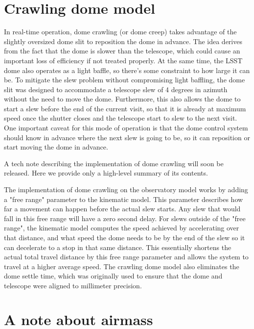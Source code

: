 \documentclass[DM,authoryear,toc]{lsstdoc}
\begin{document}
\section{Crawling dome model}

In real-time operation, dome crawling (or dome creep) takes advantage of the slightly oversized dome slit to reposition the dome in advance.
The idea derives from the fact that the dome is slower than the telescope, which could cause an important loss of efficiency if not treated properly.
At the same time, the LSST dome also operates as a light baffle, so there's some constraint to how large it can be. To mitigate the slew problem
without compromising light baffling, the dome slit was designed to accommodate a telescope slew of 4 degrees in azimuth without the need to
move the dome. Furthermore, this also allows the dome to start a slew before the end of the current visit, so that it is already at maximum speed
once the shutter closes and the telescope start to slew to the next visit. One important caveat for this mode of operation is that the dome control
system should know in advance where the next slew is going to be, so it can reposition or start moving the dome in advance.

 A tech note describing the implementation of dome crawling will soon be released. Here we provide only a high-level summary of its contents.

The implementation of dome crawling on the observatory model works by adding a "free range" parameter to the kinematic model.
This parameter describes how far a movement can happen before the actual slew starts. Any slew that would fall in this free range will have a
zero second delay. For slews outside of the "free range", the kinematic model computes the speed achieved by accelerating over that distance,
and what speed the dome needs to be by the end of the slew so it can decelerate to a stop in that same distance. This essentially shortens the
actual total travel distance by this free range parameter and allows the system to travel at a higher average speed. The crawling dome model also
eliminates the dome settle time, which was originally used to ensure that the dome and telescope were aligned to millimeter precision.

\section{A note about airmass}
\end{document}
